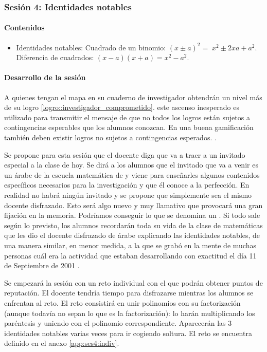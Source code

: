 \subsubsection{Sesión 4: Identidades notables}

\paragraph{Contenidos}
\begin{itemize}
	\item Identidades notables: 
	\subitem Cuadrado de un binomio: $(x\pm a)^2 = \;x^2\pm 2xa + a^2$.
	\subitem Diferencia de cuadrados: $(x-a)(x+a) = x^2-a^2$.
\end{itemize}

\paragraph{Desarrollo de la sesión}

A quienes tengan el mapa en su cuaderno de investigador obtendrán un nivel más de su logro \ref{logro::investigador_comprometido}.
%
\Justificacion{} este ascenso inesperado es utilizado para transmitir el mensaje de que no todos los logros están sujetos a contingencias esperables que los alumnos conozcan.
%
En una buena gamificación también deben existir logros no sujetos a contingencias esperados. \citep{werbach2012win}.

Se propone para esta sesión que el docente diga que va a traer a un invitado especial a la clase de hoy.
%
Se dirá a los alumnos que el invitado que va a venir es un árabe de la escuela matemática de \arab y viene para enseñarles algunos contenidos específicos necesarios para la investigación y que él conoce a la perfección.
%
En realidad no habrá ningún invitado y se propone que simplemente sea el mismo docente disfrazado.
%
Esto será algo nuevo y muy llamativo que provocará una gran fijación en la memoria.
%
Podríamos conseguir lo que se denomina un .
Si todo sale según lo previsto, los alumnos recordarán toda su vida de la clase de matemáticas que les dio el docente disfrazado de árabe explicando las identidades notables, 
%
de una manera similar, en menor medida, a la que se grabó en la mente de muchas personas cuál era la actividad que estaban desarrollando con exactitud el día 11 de Septiembre de 2001 \citep{11s}.

Se empezará la sesión con un reto individual con el que podrán obtener puntos de reputación.
%
El docente tendría tiempo para disfrazarse mientras los alumnos se enfrentan al reto.
%
El reto consistirá en unir polinomios con su factorización (aunque todavía no sepan lo que es la factorización): lo harán multiplicando los paréntesis y uniendo con el polinomio correspondiente.
%
Aparecerán las 3 identidades notables varias veces para ir cogiendo soltura.
%
El reto se encuentra definido en el anexo \ref{app:ses4:indiv}.


